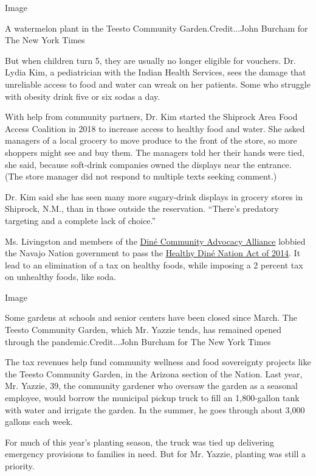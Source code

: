 Image

A watermelon plant in the Teesto Community Garden.Credit...John Burcham
for The New York Times

But when children turn 5, they are usually no longer eligible for
vouchers. Dr. Lydia Kim, a pediatrician with the Indian Health Services,
sees the damage that unreliable access to food and water can wreak on
her patients. Some who struggle with obesity drink five or six sodas a
day.

With help from community partners, Dr. Kim started the Shiprock Area
Food Access Coalition in 2018 to increase access to healthy food and
water. She asked managers of a local grocery to move produce to the
front of the store, so more shoppers might see and buy them. The
managers told her their hands were tied, she said, because soft-drink
companies owned the displays near the entrance. (The store manager did
not respond to multiple texts seeking comment.)

Dr. Kim said she has seen many more sugary-drink displays in grocery
stores in Shiprock, N.M., than in those outside the reservation.
``There's predatory targeting and a complete lack of choice.''

Ms. Livingston and members of the
\href{https://dineadvocacy.org/?fbclid=IwAR17Oomqz5BgHuhAVh693s1hPGHkWJIrRUMzaej_G393ohQe-Y2O5gCvqH0}{Diné
Community Advocacy Alliance} lobbied the Navajo Nation government to
pass the
\href{https://www.tax.navajo-nsn.gov/Navajo\%20Taxes/Regulations/Junk\%20Food\%20Tax\%20Regulations\%20\%201-14-15.pdf}{Healthy
Diné Nation Act of 2014}. It lead to an elimination of a tax on healthy
foods, while imposing a 2 percent tax on unhealthy foods, like soda.

Image

Some gardens at schools and senior centers have been closed since March.
The Teesto Community Garden, which Mr. Yazzie tends, has remained opened
through the pandemic.Credit...John Burcham for The New York Times

The tax revenues help fund community wellness and food sovereignty
projects like the Teesto Community Garden, in the Arizona section of the
Nation. Last year, Mr. Yazzie, 39, the community gardener who oversaw
the garden as a seasonal employee, would borrow the municipal pickup
truck to fill an 1,800-gallon tank with water and irrigate the garden.
In the summer, he goes through about 3,000 gallons each week.

For much of this year's planting season, the truck was tied up
delivering emergency provisions to families in need. But for Mr. Yazzie,
planting was still a priority.

